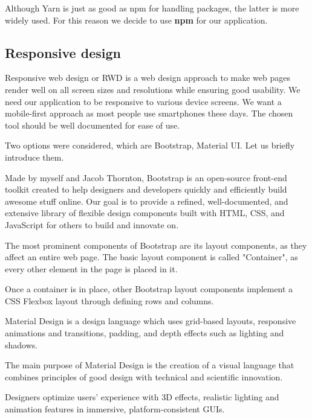   Although Yarn is just as good as npm for handling packages, the latter is more widely used.
  For this reason we decide to use \textbf{npm} for our application. 

\subsection{Responsive design}
  Responsive web design or RWD is a web design approach to make web pages render well on all screen sizes and resolutions while ensuring good usability.
  We need our application to be responsive to various device screens.
  We want a mobile-first approach as most people use smartphones these days.
  The chosen tool should be well documented for ease of use.

  Two options were considered, which are Bootstrap, Material UI.
  Let us briefly introduce them.

  Made by myself and Jacob Thornton, Bootstrap is an open-source front-end toolkit created to help designers and developers quickly and efficiently build awesome stuff online. Our goal is to provide a refined, well-documented, and extensive library of flexible design components built with HTML, CSS, and JavaScript for others to build and innovate on.

  The most prominent components of Bootstrap are its layout components, as they affect an entire web page. The basic layout component is called "Container", as every other element in the page is placed in it.

  Once a container is in place, other Bootstrap layout components implement a CSS Flexbox layout through defining rows and columns.

  Material Design is a design language which uses grid-based layouts, responsive animations and transitions, padding, and depth effects such as lighting and shadows.

  The main purpose of Material Design is the creation of a visual language that combines principles of good design with technical and scientific innovation. 

  Designers optimize users' experience with 3D effects, realistic lighting and animation features in immersive, platform-consistent GUIs.


